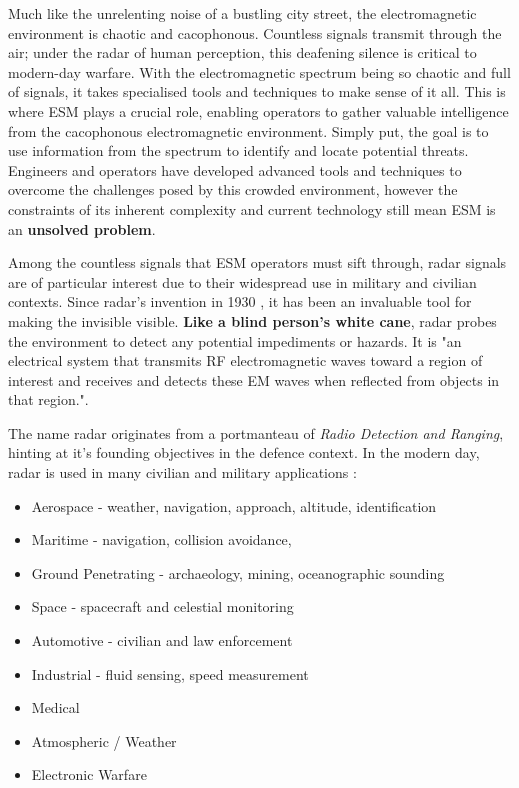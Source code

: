 Much like the unrelenting noise of a bustling city street, the electromagnetic environment is chaotic and cacophonous.
Countless signals transmit through the air; under the radar of human perception, this deafening silence is critical to modern-day warfare.
With the electromagnetic spectrum being so chaotic and full of signals, it takes specialised tools and techniques to make sense of it all.
This is where \ac{ESM} plays a crucial role, enabling operators to gather valuable intelligence from the cacophonous electromagnetic environment.
Simply put, the goal is to use information from the spectrum to identify and locate potential threats.
Engineers and operators have developed advanced tools and techniques to overcome the challenges posed by this crowded environment, however the constraints of its inherent complexity and current technology still mean \ac{ESM} is an \textbf{unsolved problem}.

Among the countless signals that \ac{ESM} operators must sift through, radar signals are of particular interest due to their widespread use in military and civilian contexts.
Since radar's invention in 1930 \cite{degering_invention_2018}, it has been an invaluable tool for making the invisible visible.
\textbf{Like a blind person's white cane}, radar probes the environment to detect any potential impediments or hazards.
It is "an electrical system that transmits \ac{RF} electromagnetic waves toward a region of interest and receives and detects these EM waves when reflected from objects in that region."\cite{richards_principles_2010}.



The name radar originates from a portmanteau of \textit{Radio Detection and Ranging}\cite{the_joint_board_on_scientific_information_policy_radar_1945}, hinting at it's founding objectives in the defence context. In the modern day, radar is used in many civilian and military applications \cite{merrill_i_skolnik_radar_nodate, desai_how_2022}:
\begin{itemize}
    \item Aerospace - weather, navigation, approach, altitude, identification
    \item Maritime - navigation, collision avoidance,  
    \item Ground Penetrating - archaeology, mining, oceanographic sounding
    \item Space - spacecraft and celestial monitoring
    \item Automotive - civilian and law enforcement
    \item Industrial - fluid sensing, speed measurement
    \item {}Medical
    \item {}Atmospheric / Weather
    \item {}Electronic Warfare
\end{itemize}

